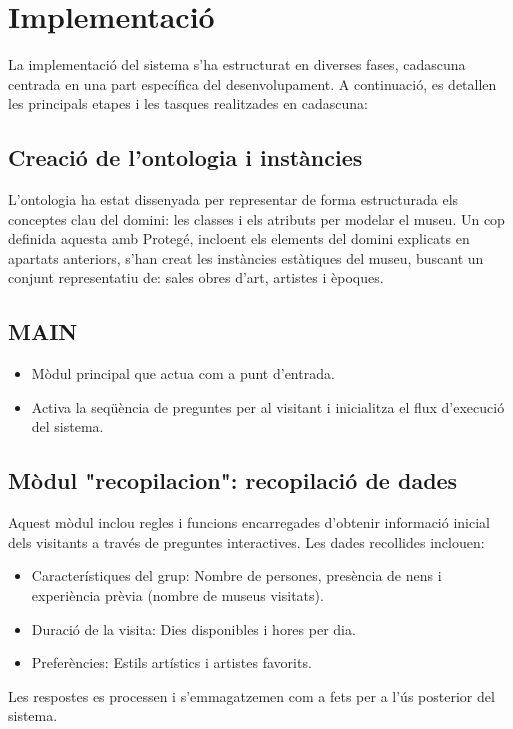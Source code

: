 \documentclass[a4paper]{article}
\begin{document}
	
	\newpage
	\section{Implementació}
	
	La implementació del sistema s'ha estructurat en diverses fases, cadascuna centrada en una part específica del desenvolupament. A continuació, es detallen les principals etapes i les tasques realitzades en cadascuna:
	
	\subsection{Creació de l’ontologia i instàncies}
	
	L’ontologia ha estat dissenyada per representar de forma estructurada els conceptes clau del domini: les classes i els atributs per modelar el museu. Un cop definida aquesta amb Protegé, incloent els elements del domini explicats en apartats anteriors, s'han creat les instàncies estàtiques del museu, buscant un conjunt representatiu de: sales obres d'art, artistes i èpoques.
	
	\subsection{MAIN}
	\begin{itemize}
		\item Mòdul principal que actua com a punt d’entrada.
		\item Activa la seqüència de preguntes per al visitant i inicialitza el flux d’execució del sistema.
	\end{itemize}
	
	
	\subsection{Mòdul "recopilacion": recopilació de dades}
	
	Aquest mòdul inclou regles i funcions encarregades d'obtenir informació inicial dels visitants a través de preguntes interactives. Les dades recollides inclouen:
	\begin{itemize}
		\item Característiques del grup: Nombre de persones, presència de nens i experiència prèvia (nombre de museus visitats).
		\item Duració de la visita: Dies disponibles i hores per dia.
		\item Preferències: Estils artístics i artistes favorits.
	\end{itemize}
	Les respostes es processen i s'emmagatzemen com a fets per a l'ús posterior del sistema.
	
\end{document}
